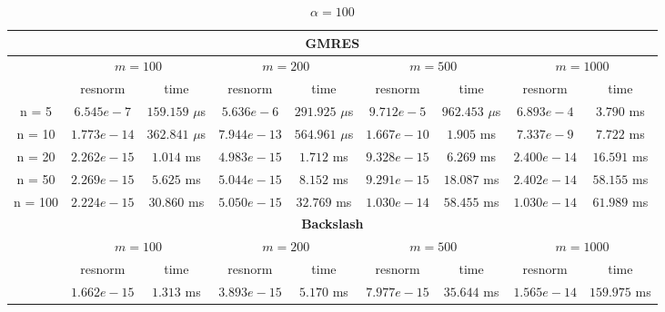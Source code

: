 \begin{table}
\centering
\caption{$\alpha = 100$}
\begin{threeparttable}
{\def\arraystretch{1.3}
\begin{tabular}{ccccccccc}
  \toprule
  \multicolumn{9}{c}{\textbf{GMRES}}\\
\midrule
& \multicolumn{2}{c}{$m = 100$} & \multicolumn{2}{c}{$m = 200$} & \multicolumn{2}{c}{$m = 500$} & \multicolumn{2}{c}{$m = 1000$}\\
\midrule
& resnorm & time & resnorm & time & resnorm & time & resnorm & time \\
\midrule
n = 5 & $6.545e-7$ & $159.159$ $\mu$s & $5.636e-6$ & $291.925$ $\mu$s & $9.712e-5$ & $962.453$ $\mu$s & $6.893e-4$ & $3.790$ ms\\
n = 10 & $1.773e-14$ & $362.841$ $\mu$s & $7.944e-13$ & $564.961$ $\mu$s & $1.667e-10$ & $1.905$ ms & $7.337e-9$ & $7.722$ ms\\
n = 20 & $2.262e-15$ & $1.014$ ms & $4.983e-15$ & $1.712$ ms & $9.328e-15$ & $6.269$ ms & $2.400e-14$ & $16.591$ ms\\
n = 50 & $2.269e-15$ & $5.625$ ms & $5.044e-15$ & $8.152$ ms & $9.291e-15$ & $18.087$ ms & $2.402e-14$ & $58.155$ ms\\
n = 100 & $2.224e-15$ & $30.860$ ms & $5.050e-15$ & $32.769$ ms & $1.030e-14$ & $58.455$ ms & $1.030e-14$ & $61.989$ ms\\
\bottomrule
\multicolumn{9}{c}{\textbf{Backslash}}\\
\midrule
& \multicolumn{2}{c}{$m = 100$} & \multicolumn{2}{c}{$m = 200$} & \multicolumn{2}{c}{$m = 500$} & \multicolumn{2}{c}{$m = 1000$}\\
\midrule
& resnorm & time & resnorm & time &resnorm & time & resnorm & time \\
\midrule
 & $1.662e-15$ & $1.313$ ms & $3.893e-15$ & $5.170$ ms & $7.977e-15$ & $35.644$ ms & $1.565e-14$ & $159.975$ ms\\
\bottomrule

\end{tabular}
}
\end{threeparttable}
\end{table}
